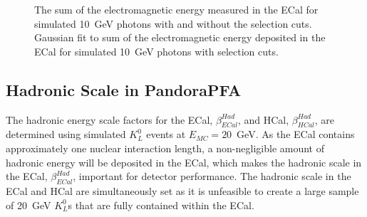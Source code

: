 \begin{figure}[h!]
\caption[\protect{} The sum of the electromagnetic energy measured in the ECal for simulated 10~GeV photons with and without the selection cuts.  \protect{} Gaussian fit to sum of the electromagnetic energy deposited in the ECal for simulated 10~GeV photons with selection cuts.]{\protect{} The sum of the electromagnetic energy measured in the ECal for simulated 10~GeV photons with and without the selection cuts.  \protect{} Gaussian fit to sum of the electromagnetic energy deposited in the ECal for simulated 10~GeV photons with selection cuts.}
\label{fig:ecalemscale}
\end{figure}


\subsection{Hadronic Scale in PandoraPFA}
\label{sec:hadscalesetting}
The hadronic energy scale factors for the ECal, $\beta^{Had}_{ECal}$, and HCal, $\beta^{Had}_{HCal}$, are determined using simulated $K^{0}_{L}$ events at $E_{MC} = 20$~GeV.  As the ECal contains approximately one nuclear interaction length, a non-negligible amount of hadronic energy will be deposited in the ECal, which makes the hadronic scale in the ECal, $\beta^{Had}_{ECal}$, important for detector performance.  The hadronic scale in the ECal and HCal are simultaneously set as it is unfeasible to create a large sample of 20~GeV $K^{0}_{L}$s that are fully contained within the ECal. 

